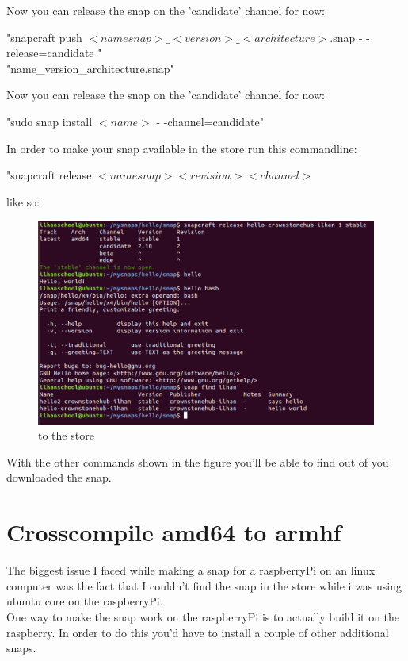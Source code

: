 \documentclass{article}
\begin{document}
\begin{flushleft}
\begin{flushleft}
Now you can release the snap on the 'candidate' channel for now:
			\begin{center}	
			"snapcraft push $<namesnap>\_<version>\_<architecture>$.snap - -release=candidate "\\ 
 "name\_version\_architecture.snap" \\
			\end{center}
\cleardoublepage
 Now you can release the snap on the 'candidate' channel for now:
			\begin{center}	
			"sudo snap install $<name>$ - -channel=candidate"
			\end{center}

In order to make your snap available in the store run this commandline:
			\begin{center}	
			"snapcraft release $<namesnap> <revision> <channel>$\\
			\end{center}
like so:
\label{fig:step16}	
	\begin{figure}[H]
	\includegraphics[width=5in]{step16.png}
	\caption[Optional caption]{to the store}
	\end{figure}
With the other commands shown in the figure you'll be able to find out of you downloaded the snap. 
\cleardoublepage
%
%
%
%
%
%
%
%
%
\section{Crosscompile amd64 to armhf}\label{sec:crosscompile}

The biggest issue I faced while making a snap for a raspberryPi on an linux computer was the fact that I couldn't find the snap in the store while i was using ubuntu core on the raspberryPi.\\
One way to make the snap work on the raspberryPi is to actually build it on the raspberry. In order to do this you'd have to install a couple of other additional snaps.
\bigskip


\end{flushleft}
\end{flushleft}
\end{document}
